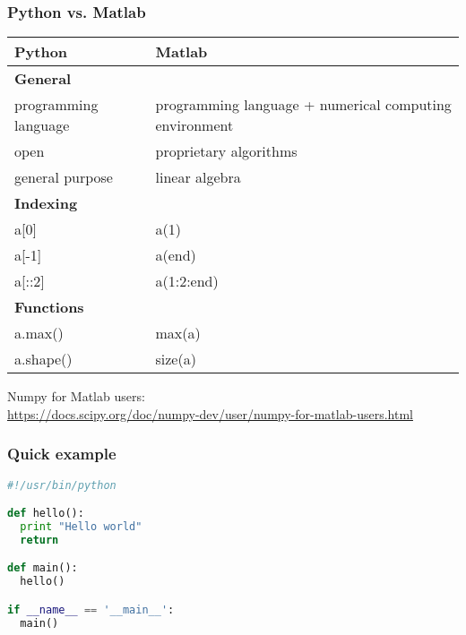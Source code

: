 \begin{frame}[fragile]
\frametitle{Python vs. Matlab}
\footnotesize

\begin{table}
\scriptsize
\begin{tabular}{p{}p{}}
\toprule
Python  	  				& Matlab\\
\midrule
\textbf{General}			& \\
programming language		& programming language + numerical computing environment\\
open						& proprietary algorithms\\
general purpose				& linear algebra\\
\midrule
\textbf{Indexing} 			& 	\\
a[0]						& a(1) \\
a[-1]						& a(end)\\
a[::2]						& a(1:2:end)\\
\midrule
\textbf{Functions}			& \\
a.max()						& max(a)\\
a.shape()					& size(a)\\
\bottomrule
\end{tabular}
\end{table}

\vfill

Numpy for Matlab users:\\
\url{https://docs.scipy.org/doc/numpy-dev/user/numpy-for-matlab-users.html}

\end{frame}


\begin{frame}[fragile]
\frametitle{Quick example}
\huge

\begin{lstlisting}[language=python]
#!/usr/bin/python

def hello():
  print "Hello world"
  return

def main():
  hello()

if __name__ == '__main__':
  main()
\end{lstlisting}

\end{frame}

